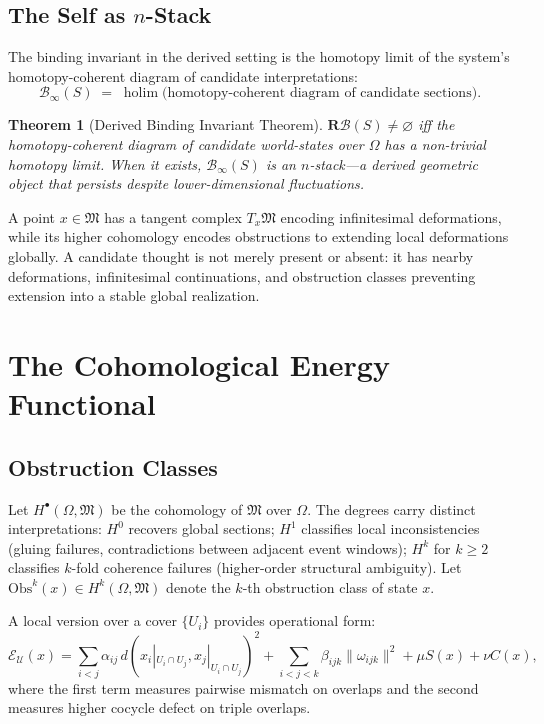 \documentclass[11pt, letterpaper]{article}
\theoremstyle{plain}
\newtheorem{theorem}{Theorem}[section]
\theoremstyle{definition}
\theoremstyle{remark}
\newcommand{\BI}{\mathcal{B}}
\newcommand{\MM}{\mathfrak{M}}
\newcommand{\EE}{\mathcal{E}}
\newcommand{\holim}{\operatorname{holim}}
\newcommand{\Obs}{\mathrm{Obs}}
\begin{document}
\subsection{The Self as $n$-Stack}

The binding invariant in the derived setting is the homotopy limit of the system's
homotopy-coherent diagram of candidate interpretations:
\[
  \BI_\infty(S) \;=\; \holim\bigl(\text{homotopy-coherent diagram of candidate sections}\bigr).
\]

\begin{theorem}[Derived Binding Invariant Theorem]
$\mathbf{R}\BI(S) \neq \varnothing$ iff the homotopy-coherent diagram of candidate
world-states over $\Omega$ has a non-trivial homotopy limit. When it exists,
$\BI_\infty(S)$ is an $n$-stack---a derived geometric object that persists despite
lower-dimensional fluctuations.
\end{theorem}

A point $x \in \MM$ has a tangent complex $T_x\MM$ encoding infinitesimal
deformations, while its higher cohomology encodes obstructions to extending local
deformations globally. A candidate thought is not merely present or absent: it has
nearby deformations, infinitesimal continuations, and obstruction classes preventing
extension into a stable global realization.

\section{The Cohomological Energy Functional}

\subsection{Obstruction Classes}

Let $H^\bullet(\Omega, \MM)$ be the cohomology of $\MM$ over $\Omega$. The degrees
carry distinct interpretations: $H^0$ recovers global sections; $H^1$ classifies local
inconsistencies (gluing failures, contradictions between adjacent event windows); $H^k$
for $k \geq 2$ classifies $k$-fold coherence failures (higher-order structural
ambiguity). Let $\Obs^k(x) \in H^k(\Omega, \MM)$ denote the $k$-th obstruction class
of state $x$.

A local version over a cover $\{U_i\}$ provides operational form:
\[
  \EE_{\mathcal{U}}(x)
  =
  \sum_{i < j}\alpha_{ij}\,d(x_i|_{U_i \cap U_j}, x_j|_{U_i \cap U_j})^2
  +
  \sum_{i<j<k}\beta_{ijk}\|\omega_{ijk}\|^2
  +
  \mu S(x) + \nu C(x),
\]
where the first term measures pairwise mismatch on overlaps and the second measures
higher cocycle defect on triple overlaps.
\end{document}
